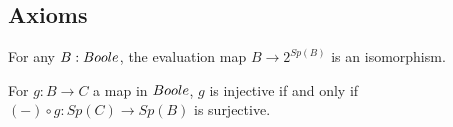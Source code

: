 \subsection{Axioms}\label{Axioms}
\begin{axiom}\label{AxStoneDuality}
  For any $B:\Boole$, 
  the evaluation map $B\rightarrow  2^{Sp(B)}$ is an isomorphism.
\end{axiom} 


\begin{axiom}\label{SurjectionsAreFormalSurjections}
  For $g:B\to C$ a map in $\Boole$, $g$ is injective if and only if
  $(-)\circ g: Sp(C) \to Sp(B)$ is surjective. 
\end{axiom} 
%


